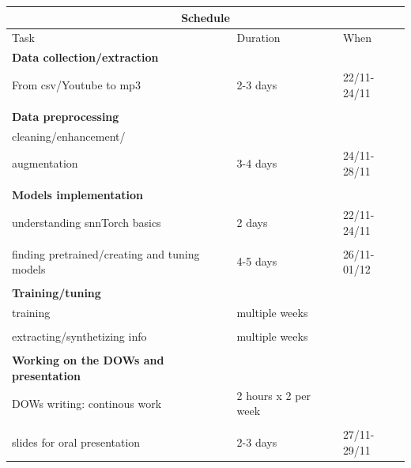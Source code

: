 \documentclass[11pt]{article}
\begin{document}
\begin{center}
  \begin{tabular}{ |p{5cm}||p{3cm}|p{3cm}| }
    \hline
    \multicolumn{3}{|c|}{Schedule}                                                     \\
    \hline
    Task                                          & Duration             & When        \\
    \hline
    \textbf{Data collection/extraction}           &                      &             \\
    From csv/Youtube to mp3                       & 2-3 days             & 22/11-24/11 \\
                                                  &                      &             \\
    \textbf{Data preprocessing}                   &                      &             \\
    cleaning/enhancement/                         &                      &             \\
    augmentation                                  & 3-4 days             & 24/11-28/11 \\
                                                  &                      &             \\
    \textbf{Models implementation}                &                      &             \\
    understanding snnTorch basics                 & 2 days               & 22/11-24/11 \\
                                                  &                      &             \\
    finding pretrained/creating and tuning models & 4-5 days             & 26/11-01/12 \\
                                                  &                      &             \\
    \textbf{Training/tuning}                      &                      &             \\
    training                                      & multiple weeks       &             \\
                                                  &                      &             \\
    extracting/synthetizing info                  & multiple weeks       &             \\
                                                  &                      &             \\
    \textbf{Working on the DOWs and presentation} &                      &             \\
    DOWs writing: continous work                  & 2 hours x 2 per week &             \\
                                                  &                      &             \\
    slides for oral presentation                  & 2-3 days             & 27/11-29/11 \\
    \hline
  \end{tabular}
\end{center}
\end{document}
